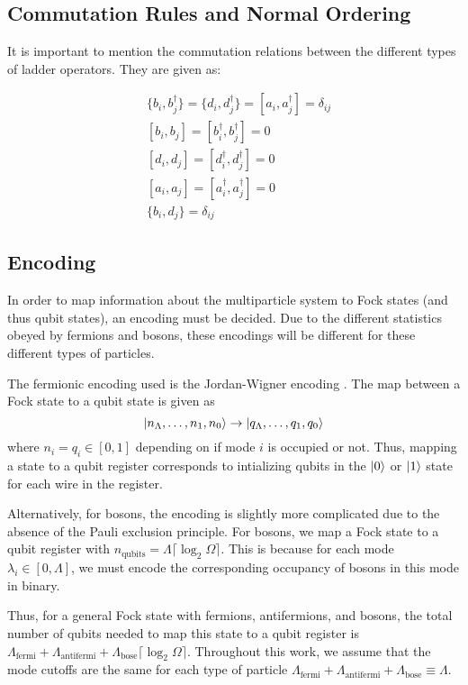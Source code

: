 \subsection{Commutation Rules and Normal Ordering}
\label{subsec:commutation}
It is important to mention the commutation relations between the different types of ladder operators. They are given as:

\begin{align*}
    &\{b_i, b_j^\dagger\} = \{d_i, d_j^\dagger\} = [a_i, a_j^\dagger] = \delta_{ij}\\
    & [b_i, b_j] = [b_i^\dagger, b_j^\dagger] = 0 \\
    & [d_i, d_j] = [d_i^\dagger, d_j^\dagger] = 0 \\
    & [a_i, a_j] = [a_i^\dagger, a_j^\dagger] = 0 \\
    & \{b_i, d_j\} = \delta_{ij}
\end{align*}

\subsection{Encoding}
\label{subsec:encoding}
In order to map information about the multiparticle system to Fock states (and thus qubit states), an encoding must be decided. Due to the different statistics obeyed by fermions and bosons, these encodings will be different for these different types of particles. 

The fermionic encoding used is the Jordan-Wigner encoding \cite{jordan-wigner}. The map between a Fock state to a qubit state is given as 
\begin{equation}
    \ket{n_\Lambda, \dots, n_1, n_0} \rightarrow \ket{q_\Lambda, \dots, q_1, q_0}
\end{equation}
where $n_i = q_i \in [0, 1]$ depending on if mode $i$ is occupied or not. Thus, mapping a state to a qubit register corresponds to intializing qubits in the $\ket{0}$ or $\ket{1}$ state for each wire in the register. 

Alternatively, for bosons, the encoding is slightly more complicated due to the absence of the Pauli exclusion principle. For bosons, we map a Fock state to a qubit register with $n_{\text{qubits}} = \Lambda \lceil \log_2{\Omega}\rceil$.
This is because for each mode $\lambda_i \in [0, \Lambda]$, we must encode the corresponding occupancy of bosons in this mode in binary. 

Thus, for a general Fock state with fermions, antifermions, and bosons, the total number of qubits needed to map this state to a qubit register is $\Lambda_{\text{fermi}} + \Lambda_{\text{antifermi}} + \Lambda_{\text{bose}} \lceil \log_2{\Omega}\rceil$.
Throughout this work, we assume that the mode cutoffs are the same for each type of particle $\Lambda_{\text{fermi}} + \Lambda_{\text{antifermi}} + \Lambda_{\text{bose}} \equiv \Lambda$.

